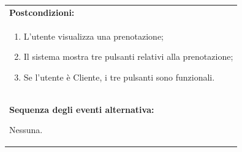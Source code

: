 \documentclass{article}
\begin{document}
\begin{table}[t]
\begin{tabular}{|p{\linewidth}|}
                        \hline
                        \cellcolor{gray!20}
                        \textbf{Postcondizioni:} \\
                        \cellcolor{gray!20}
                        \begin{minipage}{\linewidth}
                            \begin{enumerate}[noitemsep]
                                \item L'utente visualizza una prenotazione;
                                \item Il sistema mostra tre pulsanti relativi alla prenotazione;
                                \item Se l'utente è Cliente, i tre pulsanti sono funzionali.
                            \end{enumerate}
                        \end{minipage}
                        \vspace{0pt} \\
                        \hline
                        \textbf{Sequenza degli eventi alternativa:}

                        Nessuna. \\
                        \hline
                    \end{tabular}
                \end{table}
\end{document}
